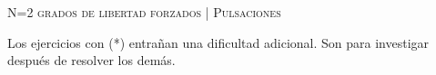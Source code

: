 \documentclass[11pt, spanish, a4paper, twopage]{article}
\begin{document}
\begin{center}
	\textsc{\LARGE N=2 grados de libertad forzados | Pulsaciones}
\end{center}

Los ejercicios con (*) entrañan una dificultad adicional. Son para investigar después de resolver los demás.



\begin{enumerate}



								



\end{enumerate}
\end{document}

